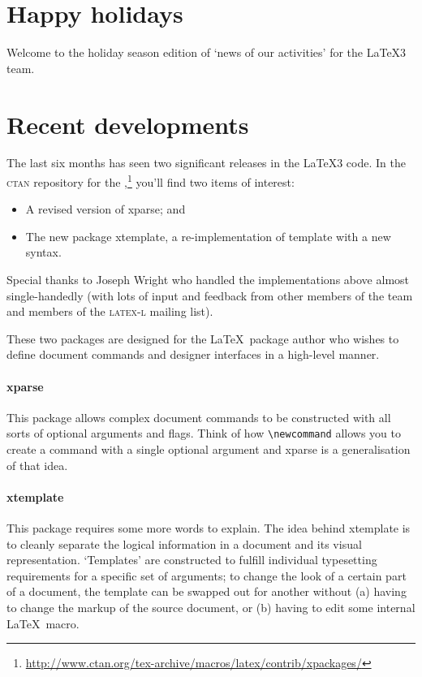 \documentclass{ltnews}
\begin{document}
\maketitle
\raisefirstsection

\section{Happy holidays}

Welcome to the holiday season edition of `news of our activities' for the \LaTeX3 team.

\section{Recent developments}

The last six months has seen two significant releases in the \LaTeX3 code.
In the \textsc{ctan} repository for the ,\footnote{\url{http://www.ctan.org/tex-archive/macros/latex/contrib/xpackages/}} you'll find two items of interest:
\begin{itemize}
\item A revised version of \textsf{xparse}; and
\item The new package \textsf{xtemplate}, a re-implementation of \textsf{template} with a new syntax.
\end{itemize}
Special thanks to Joseph Wright who handled the implementations above almost single-handedly (with lots of input and feedback from other members of the team and members of the \textsc{latex-l} mailing list).

These two packages are designed for the \LaTeX\ package author who wishes to define document commands and designer interfaces in a high-level manner.

\paragraph{\textsf{xparse}}
This package allows complex document commands to be constructed with all sorts of optional arguments and flags. Think of how \verb|\newcommand| allows you to create a command with a single optional argument and \textsf{xparse} is a generalisation of that idea.

\paragraph{\textsf{xtemplate}}
This package requires some more words to explain. The idea behind \textsf{xtemplate} is to cleanly separate the logical information in a document and its visual representation. `Templates' are constructed to fulfill individual typesetting requirements for a specific set of arguments; to change the look of a certain part of a document, the template can be swapped out for another without (a) having to change the markup of the source document, or (b) having to edit some internal \LaTeX\ macro.
\end{document}

